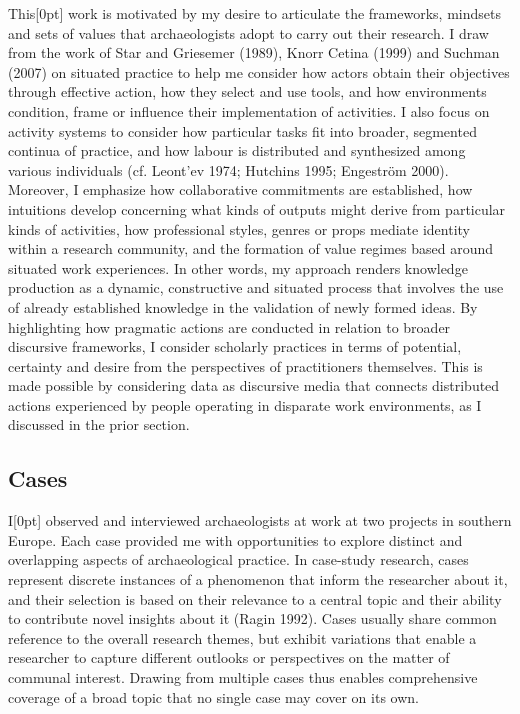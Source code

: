 \documentclass[
]{article}
\newcommand{\paragraphnumber}[1]{\marginnote{\color{lightgray}\tiny{#1}}[0pt]}
\begin{document}
This\paragraphnumber{[22]} work is motivated by my desire to articulate
the frameworks, mindsets and sets of values that archaeologists adopt to
carry out their research. I draw from the work of Star and Griesemer
(1989), Knorr Cetina (1999) and Suchman (2007) on situated practice to
help me consider how actors obtain their objectives through effective
action, how they select and use tools, and how environments condition,
frame or influence their implementation of activities. I also focus on
activity systems to consider how particular tasks fit into broader,
segmented continua of practice, and how labour is distributed and
synthesized among various individuals (cf. Leont'ev 1974; Hutchins 1995;
Engeström 2000). Moreover, I emphasize how collaborative commitments are
established, how intuitions develop concerning what kinds of outputs
might derive from particular kinds of activities, how professional
styles, genres or props mediate identity within a research community,
and the formation of value regimes based around situated work
experiences. In other words, my approach renders knowledge production as
a dynamic, constructive and situated process that involves the use of
already established knowledge in the validation of newly formed ideas.
By highlighting how pragmatic actions are conducted in relation to
broader discursive frameworks, I consider scholarly practices in terms
of potential, certainty and desire from the perspectives of
practitioners themselves. This is made possible by considering data as
discursive media that connects distributed actions experienced by people
operating in disparate work environments, as I discussed in the prior
section.

\subsection{Cases}\label{cases}

I\paragraphnumber{[23]} observed and interviewed archaeologists at work
at two projects in southern Europe. Each case provided me with
opportunities to explore distinct and overlapping aspects of
archaeological practice. In case-study research, cases represent
discrete instances of a phenomenon that inform the researcher about it,
and their selection is based on their relevance to a central topic and
their ability to contribute novel insights about it (Ragin 1992). Cases
usually share common reference to the overall research themes, but
exhibit variations that enable a researcher to capture different
outlooks or perspectives on the matter of communal interest. Drawing
from multiple cases thus enables comprehensive coverage of a broad topic
that no single case may cover on its own.
\end{document}

